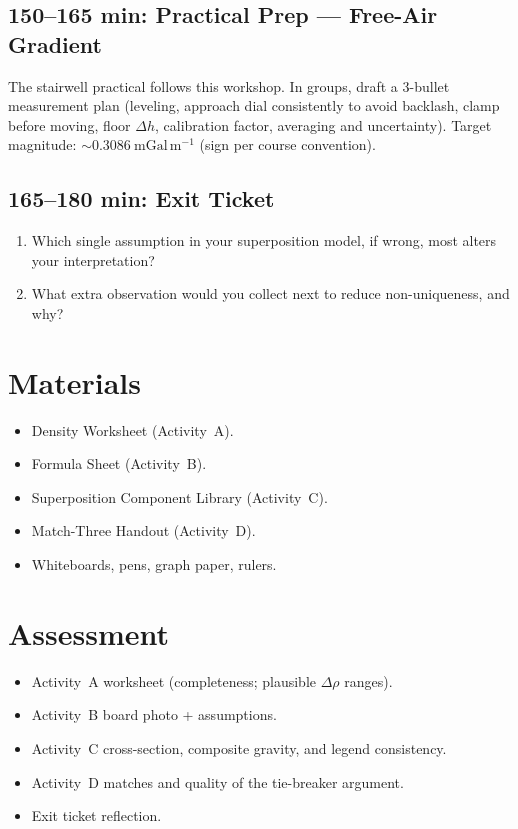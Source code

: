 \documentclass[11pt,a4paper]{article}
\begin{document}
\subsection*{150--165 min: Practical Prep --- Free-Air Gradient}
The stairwell practical follows this workshop. In groups, draft a 3-bullet measurement plan (leveling, approach dial consistently to avoid backlash, clamp before moving, floor $\Delta h$, calibration factor, averaging and uncertainty). Target magnitude: $\sim 0.3086~\mathrm{mGal\,m^{-1}}$ (sign per course convention).

\subsection*{165--180 min: Exit Ticket}
\begin{enumerate}
  \item Which single assumption in your superposition model, if wrong, most alters your interpretation?
  \item What extra observation would you collect next to reduce non-uniqueness, and why?
\end{enumerate}

\section*{Materials}
\begin{itemize}
  \item Density Worksheet (Activity~A).
  \item Formula Sheet (Activity~B).
  \item Superposition Component Library (Activity~C).
  \item Match-Three Handout (Activity~D).
  \item Whiteboards, pens, graph paper, rulers.
\end{itemize}

\section*{Assessment}
\begin{itemize}
  \item Activity~A worksheet (completeness; plausible $\Delta\rho$ ranges).
  \item Activity~B board photo + assumptions.
  \item Activity~C cross-section, composite gravity, and legend consistency.
  \item Activity~D matches and quality of the tie-breaker argument.
  \item Exit ticket reflection.
\end{itemize}
\end{document}

